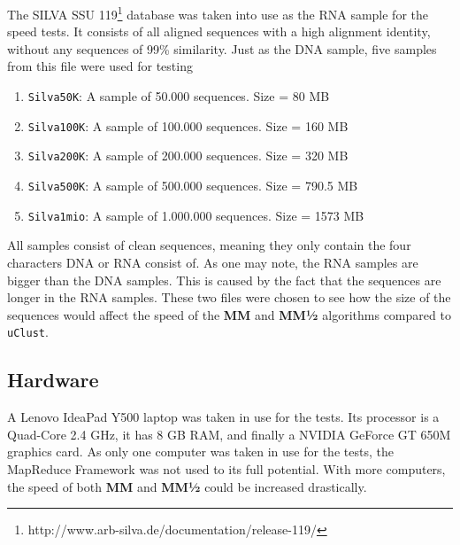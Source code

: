 \documentclass[../../main.tex]{subfiles}
\begin{document}
The SILVA SSU 119\footnote{http://www.arb-silva.de/documentation/release-119/} database was taken into use as the RNA sample for the speed tests. It consists of all aligned sequences with a high alignment identity, without any sequences of 99\% similarity. Just as the DNA sample, five samples from this file were used for testing
\begin{enumerate}
\item \texttt{Silva50K}: A sample of 50.000 sequences. Size = 80 MB
\item \texttt{Silva100K}: A sample of 100.000 sequences. Size = 160 MB
\item \texttt{Silva200K}: A sample of 200.000 sequences. Size = 320 MB
\item \texttt{Silva500K}: A sample of 500.000 sequences. Size = 790.5 MB
\item \texttt{Silva1mio}: A sample of 1.000.000 sequences. Size = 1573 MB
\end{enumerate}

All samples consist of clean sequences, meaning they only contain the four characters DNA or RNA consist of. As one may note, the RNA samples are bigger than the DNA samples. This is caused by the fact that the sequences are longer in the RNA samples. These two files were chosen to see how the size of the sequences would affect the speed of the {\bf MM} and {\bf MM½} algorithms compared to \texttt{uClust}.

\subsection{Hardware}
A Lenovo IdeaPad Y500 laptop was taken in use for the tests. Its processor is a Quad-Core 2.4 GHz, it has 8 GB RAM, and finally a NVIDIA GeForce GT 650M graphics card. As only one computer was taken in use for the tests, the MapReduce Framework was not used to its full potential. With more computers, the speed of both {\bf MM} and {\bf MM½} could be increased drastically. 
\end{document}
